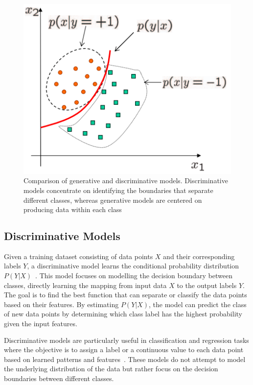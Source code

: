 \documentclass[12pt,DIV14,BCOR12mm,a4paper,footinclude=false,headinclude,parskip=half-,twoside,openright,cleardoublepage=empty,toc=index,bibliography=totoc,listof=totoc]{scrreprt}
\numberwithin{equation}{chapter}
\begin{document}
\begin{figure}
	\centering
	\includegraphics[scale=.7]{../media/Discriminative Vs Generative.PNG}
	\caption{Comparison of generative and discriminative models. Discriminative models concentrate on identifying the boundaries that separate different classes, whereas generative models are centered on producing data within each class\cite{tu2007learning}}
	\label{disc_vs_gen}
\end{figure}

\subsection{Discriminative Models}
Given a training dataset consisting of data points \(X\) and their corresponding labels \(Y\), a discriminative model learns the conditional probability distribution \(P(Y | X)\)~\cite{deng2016deep}. This model focuses on modelling the decision boundary between classes, directly learning the mapping from input data \(X\)  to the output labels \(Y\). The goal is to find the best function that can separate or classify the data points based on their features. By estimating \(P(Y | X)\), the model can predict the class of new data points by determining which class label has the highest probability given the input features.

Discriminative models are particularly useful in classification and regression tasks where the objective is to assign a label or a continuous value to each data point based on learned patterns and features~\cite{wikipedia2024}. These models do not attempt to model the underlying distribution of the data but rather focus on the decision boundaries between different classes.
\end{document}
